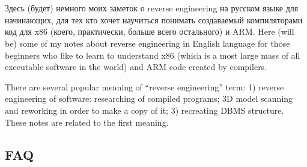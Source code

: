﻿\chapter{}

\IFRU
{Здесь (будет) немного моих заметок о reverse engineering на русском языке для начинающих, 
для тех кто хочет научиться понимать создаваемый \CCpp компиляторами код для x86 (коего, 
практически, больше всего остального) и ARM.}
{Here (will be) some of my notes about reverse engineering in English language for 
those beginners who like to learn to understand x86 (which is a most large mass of 
all executable software in the world) and ARM code created by \CCpp compilers.}

{There are several popular meaning of ``reverse engineering'' term: 
1) reverse engineering of software: researching of compiled programs;
3D model scanning and reworking in order to make a copy of it;
3) recreating \ac{DBMS} structure.
These notes are related to the first meaning.}

\section{\ac{FAQ}}

